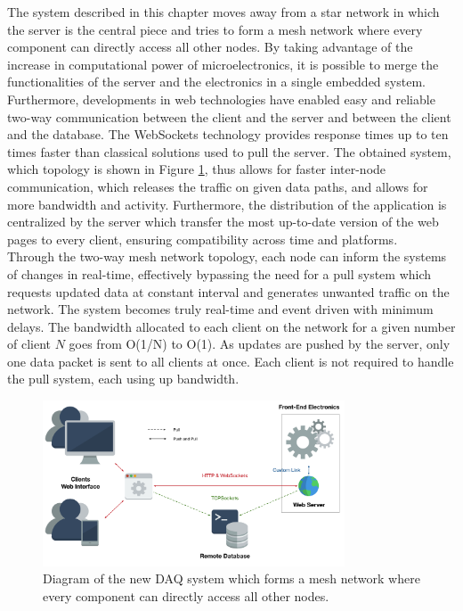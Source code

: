     The system described in this chapter moves away from a star network in which the server is the central piece and tries to form a mesh network where every component can directly access all other nodes. By taking advantage of the increase in computational power of microelectronics, it is possible to merge the functionalities of the server and the electronics in a single embedded system. Furthermore, developments in web technologies have enabled easy and reliable two-way communication between the client and the server and between the client and the database. The WebSockets technology provides response times up to ten times faster than classical solutions used to pull the server. The obtained system, which topology is shown in Figure \ref{fig:III-2-system-new}, thus allows for faster inter-node communication, which releases the traffic on given data paths, and allows for more bandwidth and activity. Furthermore, the distribution of the application is centralized by the server which transfer the most up-to-date version of the web pages to every client, ensuring compatibility across time and platforms. \\

    Through the two-way mesh network topology, each node can inform the systems of changes in real-time, effectively bypassing the need for a pull system which requests updated data at constant interval and generates unwanted traffic on the network. The system becomes truly real-time and event driven with minimum delays. The bandwidth allocated to each client on the network for a given number of client $ N $ goes from O(1/N) to O(1). As updates are pushed by the server, only one data packet is sent to all clients at once. Each client is not required to handle the pull system, each using up bandwidth.

    \begin{figure}[t!]
      \centering
      \includegraphics[width=0.8\textwidth]{img/III-2-web-daq/new-sys.png}
      \caption{Diagram of the new DAQ system which forms a mesh network where every component can directly access all other nodes.}
      \label{fig:III-2-system-new}
    \end{figure}

